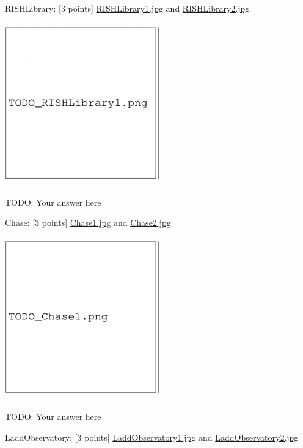 \documentclass{csci1430}
\begin{document}
RISHLibrary: [3 points]
\href{images/RISHLibrary1.jpg}{RISHLibrary1.jpg} and \href{images/RISHLibrary2.jpg}{RISHLibrary2.jpg} 

\begin{answer}
\includegraphics[width=0.5\textwidth,height=7cm,keepaspectratio]{images/TODO_RishLibrary1.png}

TODO: Your answer here
\end{answer}

\pagebreak

Chase: [3 points]
\href{images/Chase1.jpg}{Chase1.jpg} and \href{images/Chase2.jpg}{Chase2.jpg}

\begin{answer}
\includegraphics[width=0.5\textwidth,height=7cm,keepaspectratio]{images/TODO_Chase1.png}

TODO: Your answer here
\end{answer}
    
\pagebreak


LaddObservatory: [3 points]
\href{images/LaddObservatory1.jpg}{LaddObservatory1.jpg} and \href{images/LaddObservatory2.jpg}{LaddObservatory2.jpg}
\end{document}
